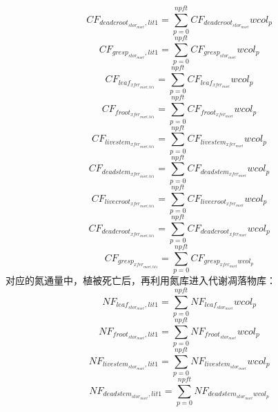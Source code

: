 \begin{equation}
  CF_{deadcroot_{{stor}_{mort}},lit1}=\sum_{p=0}^{npft}{CF_{deadcroot_{{stor}_{mort}}}{wcol_p}}
\end{equation}
\begin{equation}
  CF_{gresp_{{stor}_{mort}},lit1}=\sum_{p=0}^{npft}{CF_{gresp_{{stor_{mort}}}}{wcol_p}}
\end{equation}
\begin{equation}
  CF_{leaf_{xfer_{mort,lit1}}}=\sum_{p=0}^{npft}{CF_{leaf_{{xfer_{mort}}}}{wcol_p}}
\end{equation}
\begin{equation}
  CF_{froot_{xfer_{mort,lit1}}}=\sum_{p=0}^{npft}{CF_{froot_{{xfer_{mort}}}}{wcol_p}}
\end{equation}
\begin{equation}
  CF_{livestem_{xfer_{mort,lit1}}}=\sum_{p=0}^{npft}{CF_{livestem_{{xfer_{mort}}}}{wcol_p}}
\end{equation}
\begin{equation}
  CF_{deadstem_{xfer_{mort,lit1}}}=\sum_{p=0}^{npft}{CF_{deadstem_{xfer_{mort}}}{wcol_p}}
\end{equation}
\begin{equation}
  CF_{livecroot_{xfer_{mort,lit1}}}=\sum_{p=0}^{npft}{CF_{livecroot_{{xfer_{mort}}}}{wcol_p}}
\end{equation}
\begin{equation}
  CF_{deadcroot_{xfer_{mort,lit1}}}=\sum_{p=0}^{npft}{CF_{deadcroot_{{xfer_{mort}}}}{wcol_p}}
\end{equation}
\begin{equation}
  CF_{gresp_{xfer_{mort,lit1}}}=\sum_{p=0}^{npft}{CF_{gresp_{{xfer}_{mort}}{wcol_p}}}
\end{equation}
对应的氮通量中，植被死亡后，再利用氮库进入代谢凋落物库：
\begin{equation}
  NF_{leaf_{{stor}_{mort}},lit1}=\sum_{p=0}^{npft}{NF_{leaf_{{stor}_{mort}}}{wcol_p}}
\end{equation}
\begin{equation}
  NF_{froot_{{stor}_{mort}},lit1}=\sum_{p=0}^{npft}{NF_{froot_{{stor}_{mort}}}{wcol_p}}
\end{equation}
\begin{equation}
  NF_{livestem_{{stor}_{mort}},lit1}=\sum_{p=0}^{npft}{NF_{livestem_{{stor}_{mort}}}{wcol_p}}
\end{equation}
\begin{equation}
  NF_{deadstem_{{stor}_{mort}},lit1}=\sum_{p=0}^{npft}{NF_{deadstem_{{stor}_{mort}}{wcol_p}}}
\end{equation}
